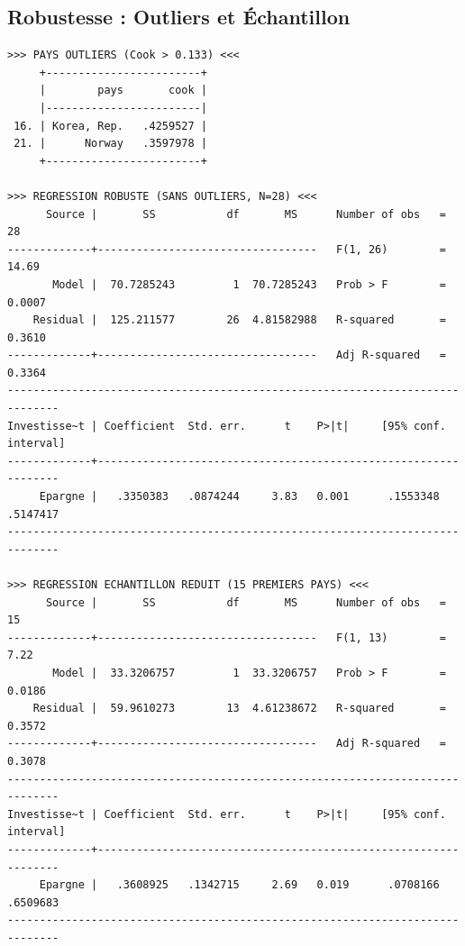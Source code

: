 \documentclass[12pt, a4paper]{article}
\begin{document}
{%
\subsection{Robustesse : Outliers et Échantillon}
\begin{verbatim}
>>> PAYS OUTLIERS (Cook > 0.133) <<<
     +------------------------+
     |        pays       cook |
     |------------------------|
 16. | Korea, Rep.   .4259527 |
 21. |      Norway   .3597978 |
     +------------------------+

>>> REGRESSION ROBUSTE (SANS OUTLIERS, N=28) <<<
      Source |       SS           df       MS      Number of obs   =        28
-------------+----------------------------------   F(1, 26)        =     14.69
       Model |  70.7285243         1  70.7285243   Prob > F        =    0.0007
    Residual |  125.211577        26  4.81582988   R-squared       =    0.3610
-------------+----------------------------------   Adj R-squared   =    0.3364
------------------------------------------------------------------------------
Investisse~t | Coefficient  Std. err.      t    P>|t|     [95% conf. interval]
-------------+----------------------------------------------------------------
     Epargne |   .3350383   .0874244     3.83   0.001      .1553348   .5147417
------------------------------------------------------------------------------

>>> REGRESSION ECHANTILLON REDUIT (15 PREMIERS PAYS) <<<
      Source |       SS           df       MS      Number of obs   =        15
-------------+----------------------------------   F(1, 13)        =      7.22
       Model |  33.3206757         1  33.3206757   Prob > F        =    0.0186
    Residual |  59.9610273        13  4.61238672   R-squared       =    0.3572
-------------+----------------------------------   Adj R-squared   =    0.3078
------------------------------------------------------------------------------
Investisse~t | Coefficient  Std. err.      t    P>|t|     [95% conf. interval]
-------------+----------------------------------------------------------------
     Epargne |   .3608925   .1342715     2.69   0.019      .0708166   .6509683
------------------------------------------------------------------------------
\end{verbatim}

\newpage

}
\end{document}
